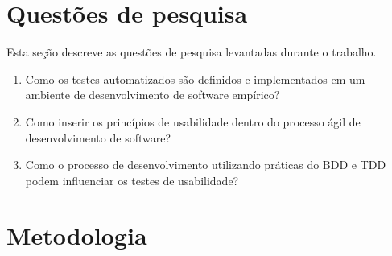 \section{Questões de pesquisa}

Esta seção descreve as questões de pesquisa levantadas durante o trabalho.
	
\begin{enumerate}
\item Como os testes automatizados são definidos e implementados em um ambiente de desenvolvimento de software empírico?
\item Como inserir os princípios de usabilidade dentro do processo ágil de desenvolvimento de software?
\item Como o processo de desenvolvimento utilizando práticas do BDD e TDD podem influenciar os testes de usabilidade?
\end{enumerate}
\section{Metodologia}

